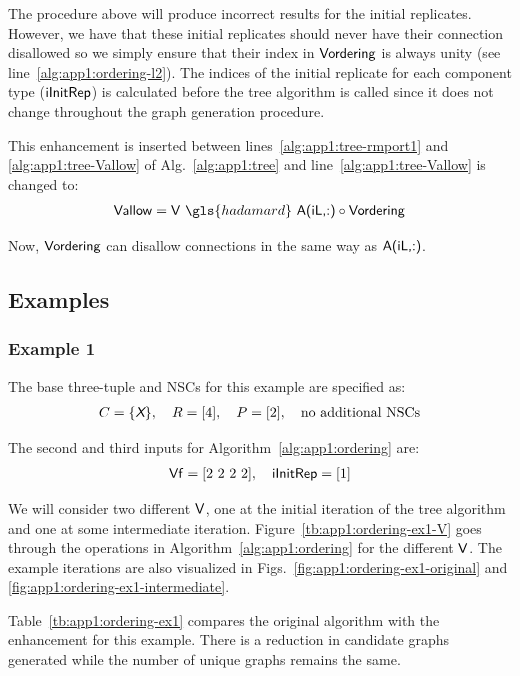 The procedure above will produce incorrect results for the initial replicates. However, we have that these initial replicates should never have their connection disallowed so we simply ensure that their index in $\textup{\textsf{Vordering}}$ is always unity (see line~\ref{alg:app1:ordering-l2}).
The indices of the initial replicate for each component type ($\textup{\textsf{iInitRep}}$) is calculated before the tree algorithm is called since it does not change throughout the graph generation procedure.

This enhancement is inserted between lines~\ref{alg:app1:tree-rmport1} and \ref{alg:app1:tree-Vallow} of Alg.~\ref{alg:app1:tree} and line~\ref{alg:app1:tree-Vallow} is changed to:
\begin{align}
\xvar{Vallow} = \xvar{V} \ \gls{hadamard}\ \xvar{A(iL,:)} \circ \xvar{Vordering} 
\end{align}

\noindent Now, $\textup{\textsf{Vordering}}$ can disallow connections in the same way as $\textup{\textsf{A(iL,:)}}$.

\subsection{Examples}

\subsubsection{Example 1\label{sec:app1:ordering-ex1}}

The base three-tuple and NSCs for this example are specified as:
\begin{align}
C = \{ \textsl{\textsf{X}} \}, \quad R = [4], \quad P = [2], \quad \text{no additional NSCs}
\end{align}

\noindent The second and third inputs for Algorithm~\ref{alg:app1:ordering} are:
\begin{align}
\textup{\textsf{Vf}} = \text{[2 2 2 2]}, \quad \textup{\textsf{iInitRep}} = [1]
\end{align}

We will consider two different $\textup{\textsf{V}}$, one at the initial iteration of the tree algorithm and one at some intermediate iteration.
Figure~\ref{tb:app1:ordering-ex1-V} goes through the operations in Algorithm~\ref{alg:app1:ordering} for the different $\textup{\textsf{V}}$.
The example iterations are also visualized in Figs.~\ref{fig:app1:ordering-ex1-original} and \ref{fig:app1:ordering-ex1-intermediate}.

Table~\ref{tb:app1:ordering-ex1} compares the original algorithm with the enhancement for this example.
There is a reduction in candidate graphs generated while the number of unique graphs remains the same.

